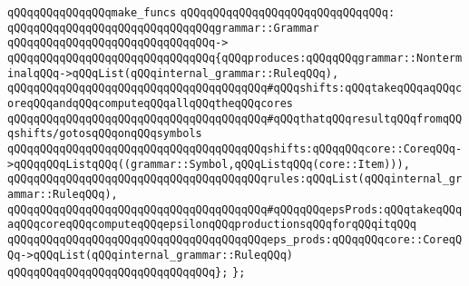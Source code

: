 \verb|qQQqqQQqqQQqqQQqmake_funcs|\newline
\verb|qQQqqQQqqQQqqQQqqQQqqQQqqQQqqQQq:|\newline
\verb|qQQqqQQqqQQqqQQqqQQqqQQqqQQqqQQqgrammar::Grammar|\newline
\verb|qQQqqQQqqQQqqQQqqQQqqQQqqQQqqQQq->|\newline
\verb|qQQqqQQqqQQqqQQqqQQqqQQqqQQqqQQq{qQQqproduces:qQQqqQQqgrammar::NonterminalqQQq->qQQqList(qQQqinternal_grammar::RuleqQQq),|\newline
\newline
\verb|qQQqqQQqqQQqqQQqqQQqqQQqqQQqqQQqqQQqqQQq#qQQqshifts:qQQqtakeqQQqaqQQqcoreqQQqandqQQqcomputeqQQqallqQQqtheqQQqcores|\newline
\verb|qQQqqQQqqQQqqQQqqQQqqQQqqQQqqQQqqQQqqQQq#qQQqthatqQQqresultqQQqfromqQQqshifts/gotosqQQqonqQQqsymbols|\newline
\newline
\verb|qQQqqQQqqQQqqQQqqQQqqQQqqQQqqQQqqQQqqQQqshifts:qQQqqQQqcore::CoreqQQq->qQQqqQQqListqQQq((grammar::Symbol,qQQqListqQQq(core::Item))),|\newline
\verb|qQQqqQQqqQQqqQQqqQQqqQQqqQQqqQQqqQQqqQQqrules:qQQqList(qQQqinternal_grammar::RuleqQQq),|\newline
\newline
\verb|qQQqqQQqqQQqqQQqqQQqqQQqqQQqqQQqqQQqqQQq#qQQqqQQqepsProds:qQQqtakeqQQqaqQQqcoreqQQqcomputeqQQqepsilonqQQqproductionsqQQqforqQQqitqQQq|\newline
\newline
\verb|qQQqqQQqqQQqqQQqqQQqqQQqqQQqqQQqqQQqqQQqeps_prods:qQQqqQQqcore::CoreqQQq->qQQqList(qQQqinternal_grammar::RuleqQQq)|\newline
\verb|qQQqqQQqqQQqqQQqqQQqqQQqqQQqqQQq};|\newline
\verb|};|\newline
\newline

